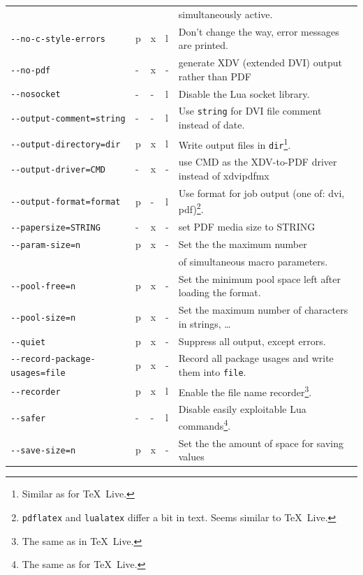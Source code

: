 \documentclass[a4paper]{article}%
\newcommand{\pdflatex}{\texttt{pdflatex}}
\newcommand{\lualatex}{\texttt{lualatex}}
\newcommand{\texlive}{\TeX~Live}
\begin{document}
{\begin{longtable}{lllll}
                                      &  & &        & simultaneously active. \\
\texttt{-{}-no-c-style-errors}        & p&x&l       & Don't change the way, error messages are printed. \\
\texttt{-{}-no-pdf}                   & -&x&- & generate XDV (extended DVI) output rather than PDF \\
\texttt{-{}-nosocket}                 & -&-&l & Disable the Lua socket library. \\
\texttt{-{}-output-comment=string}    & -&-&l & Use \texttt{string} for DVI file comment instead of date. \\
\texttt{-{}-output-directory=dir}     & p&x&l       & Write output files in \texttt{dir}\footnote%
{Similar as for \texlive. }. \\
\texttt{-{}-output-driver=CMD}        & -&x&- & use CMD as the XDV-to-PDF driver instead of xdvipdfmx \\
\texttt{-{}-output-format=format}     & p&-&l  & Use format for job output (one of: dvi, pdf)\footnote%
{\pdflatex{} and \lualatex{} differ a bit in text. Seems similar to \texlive. }. \\
\texttt{-{}-papersize=STRING}         & -&x&- & set PDF media size to STRING \\
\texttt{-{}-param-size=n}             & p&x&- & Set the the maximum number \\
                                      &  & &        & of simultaneous macro parameters. \\
\texttt{-{}-pool-free=n}              & p&x&- & Set the minimum pool space left after loading the format. \\
\texttt{-{}-pool-size=n}              & p&x&- & Set the maximum number of characters in strings, \dots \\
\texttt{-{}-quiet}                    & p&x&- & Suppress all output, except errors. \\
\texttt{-{}-record-package-usages=file} & p&x&- & Record all package usages and write them into \texttt{file}. \\
\texttt{-{}-recorder}                 & p&x&l       & Enable the file name recorder\footnote%
{The same as in \texlive. }. \\
\texttt{-{}-safer}                    & -&-&l & Disable easily exploitable Lua commands\footnote%
   {The same as for \texlive. }.   \\
\texttt{-{}-save-size=n}              & p&x&- & Set the the amount of space for saving values \\

\end{longtable}}
\end{document}
